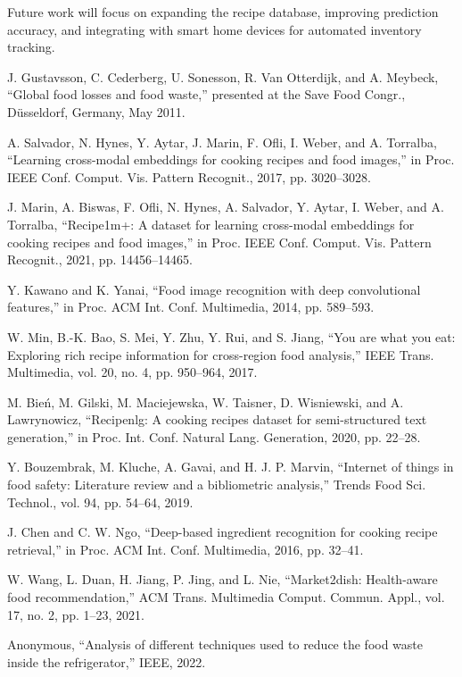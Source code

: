 \documentclass[conference]{IEEEtran}
\begin{document}
Future work will focus on expanding the recipe database, improving prediction accuracy, and integrating with smart home devices for automated inventory tracking.

\begin{thebibliography}{00}

J. Gustavsson, C. Cederberg, U. Sonesson, R. Van Otterdijk, and A. Meybeck, ``Global food losses and food waste,'' presented at the Save Food Congr., Düsseldorf, Germany, May 2011.

A. Salvador, N. Hynes, Y. Aytar, J. Marin, F. Ofli, I. Weber, and A. Torralba, ``Learning cross-modal embeddings for cooking recipes and food images,'' in Proc. IEEE Conf. Comput. Vis. Pattern Recognit., 2017, pp. 3020–3028.

J. Marin, A. Biswas, F. Ofli, N. Hynes, A. Salvador, Y. Aytar, I. Weber, and A. Torralba, ``Recipe1m+: A dataset for learning cross-modal embeddings for cooking recipes and food images,'' in Proc. IEEE Conf. Comput. Vis. Pattern Recognit., 2021, pp. 14456–14465.

Y. Kawano and K. Yanai, ``Food image recognition with deep convolutional features,'' in Proc. ACM Int. Conf. Multimedia, 2014, pp. 589–593.

W. Min, B.-K. Bao, S. Mei, Y. Zhu, Y. Rui, and S. Jiang, ``You are what you eat: Exploring rich recipe information for cross-region food analysis,'' IEEE Trans. Multimedia, vol. 20, no. 4, pp. 950–964, 2017.

M. Bie\'n, M. Gilski, M. Maciejewska, W. Taisner, D. Wisniewski, and A. Lawrynowicz, ``Recipenlg: A cooking recipes dataset for semi-structured text generation,'' in Proc. Int. Conf. Natural Lang. Generation, 2020, pp. 22–28.

Y. Bouzembrak, M. Kluche, A. Gavai, and H. J. P. Marvin, ``Internet of things in food safety: Literature review and a bibliometric analysis,'' Trends Food Sci. Technol., vol. 94, pp. 54–64, 2019.

J. Chen and C. W. Ngo, ``Deep-based ingredient recognition for cooking recipe retrieval,'' in Proc. ACM Int. Conf. Multimedia, 2016, pp. 32–41.

W. Wang, L. Duan, H. Jiang, P. Jing, and L. Nie, ``Market2dish: Health-aware food recommendation,'' ACM Trans. Multimedia Comput. Commun. Appl., vol. 17, no. 2, pp. 1–23, 2021.

Anonymous, ``Analysis of different techniques used to reduce the food waste inside the refrigerator,'' IEEE, 2022.

\end{thebibliography}
\end{document}

